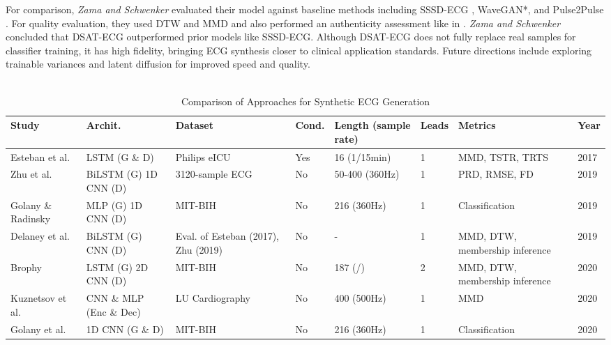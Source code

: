 For comparison, \textit{Zama and Schwenker} evaluated their model against baseline methods including SSSD-ECG \cite{alcaraz_diffusion-based_2023}, WaveGAN*, and Pulse2Pulse \cite{sang_generation_2022}. For quality evaluation, they used DTW and MMD and also performed an authenticity assessment like in \cite{alcaraz_diffusion-based_2023}. \textit{Zama and Schwenker} concluded that DSAT-ECG outperformed prior models like SSSD-ECG. Although DSAT-ECG does not fully replace real samples for classifier training, it has high fidelity, bringing ECG synthesis closer to clinical application standards. Future directions include exploring trainable variances and latent diffusion for improved speed and quality.
\\ \\


\begin{table}[ht]
\centering
\caption{Comparison of Approaches for Synthetic ECG Generation}
\label{tab:ECG_comparison}
\small
\begin{tabular}{|p{1.5cm}|p{2.3cm}|p{1.8cm}|p{1cm}|p{1.8cm}|p{1cm}|p{1.8cm}|p{0.7cm}|}
\hline
\textbf{Study} & \textbf{Archit.} & \textbf{Dataset} & \textbf{Cond.} & \textbf{Length (sample rate)} & \textbf{Leads} & \textbf{Metrics} & \textbf{Year} \\
\hline
Esteban et al. \cite{esteban_real-valued_2017} & LSTM (G \& D) & Philips eICU & Yes & 16 (1/15min) & 1 & MMD, TSTR, TRTS & 2017 \\
\hline
Zhu et al. \cite{zhu_electrocardiogram_2019} & BiLSTM (G) 1D CNN (D) & 3120-sample ECG & No & 50-400 (360Hz) & 1 & PRD, RMSE, FD & 2019 \\
\hline
Golany \& Radinsky \cite{golany_pgans_2019} & MLP (G) 1D CNN (D) & MIT-BIH & No & 216 (360Hz) & 1 & Classification & 2019 \\
\hline
Delaney et al. \cite{delaney_synthesis_2019} & BiLSTM (G) CNN (D) & Eval. of Esteban (2017), Zhu (2019) & No & - & 1 & MMD, DTW, membership inference & 2019 \\
\hline
Brophy \cite{brophy_synthesis_2020} & LSTM (G) 2D CNN (D) & MIT-BIH & No & 187 (/) & 2 & MMD, DTW, membership inference & 2020 \\
\hline
Kuznetsov et al. \cite{kuznetsov_electrocardiogram_2020} & CNN \& MLP (Enc \& Dec) & LU Cardiography & No & 400 (500Hz) & 1 & MMD & 2020 \\
\hline
Golany et al. \cite{golany_simgans_2020} & 1D CNN (G \& D) & MIT-BIH & No & 216 (360Hz) & 1 & Classification & 2020 \\

\end{tabular}
\end{table}
